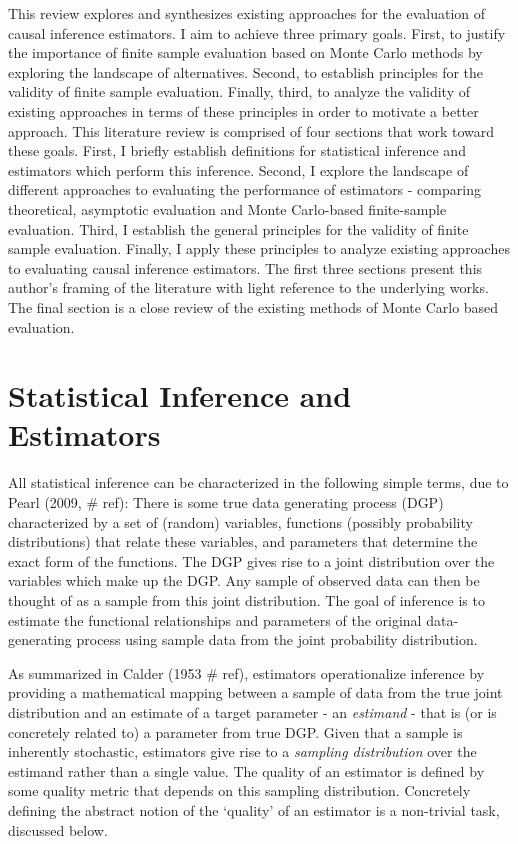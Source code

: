 \documentclass[../main.tex]{subfiles}
\begin{document}
This review explores and synthesizes existing approaches for the evaluation of causal inference estimators. I aim to achieve three primary goals. First, to justify the importance of finite sample evaluation based on Monte Carlo methods by exploring the landscape of alternatives. Second, to establish principles for the validity of finite sample evaluation. Finally, third, to analyze the validity of existing approaches in terms of these principles in order to motivate a better approach. This literature review is comprised of four sections that work toward these goals. First, I briefly establish definitions for statistical inference and estimators which perform this inference. Second, I explore the landscape of different approaches to evaluating the performance of estimators - comparing theoretical, asymptotic evaluation and Monte Carlo-based finite-sample evaluation. Third, I establish the general principles for the validity of finite sample evaluation. Finally, I apply these principles to analyze existing approaches to evaluating causal inference estimators. The first three sections present this author’s framing of the literature with light reference to the underlying works. The final section is a close review of the existing methods of Monte Carlo based evaluation.\par

\section{Statistical Inference and Estimators}

\vspace{\baselineskip}
All statistical inference can be characterized in the following simple terms, due to Pearl (2009, $\#$ ref): There is some true data generating process (DGP) characterized by a set of (random) variables, functions (possibly probability distributions) that relate these variables, and parameters that determine the exact form of the functions. The DGP gives rise to a joint distribution over the variables which make up the DGP. Any sample of observed data can then be thought of as a sample from this joint distribution. The goal of inference is to estimate the functional relationships and parameters of the original data-generating process using sample data from the joint probability distribution.\par


\vspace{\baselineskip}
As summarized in Calder (1953 $\#$ ref), estimators operationalize inference by providing a mathematical mapping between a sample of data from the true joint distribution and an estimate of a target parameter - an \textit{estimand} - that is (or is concretely related to) a parameter from true DGP. Given that a sample is inherently stochastic, estimators give rise to a \textit{sampling distribution }over the estimand rather than a single value. The quality of an estimator is defined by some quality metric that depends on this sampling distribution. Concretely defining the abstract notion of the ‘quality’ of an estimator is a non-trivial task, discussed below.\par
\end{document}
